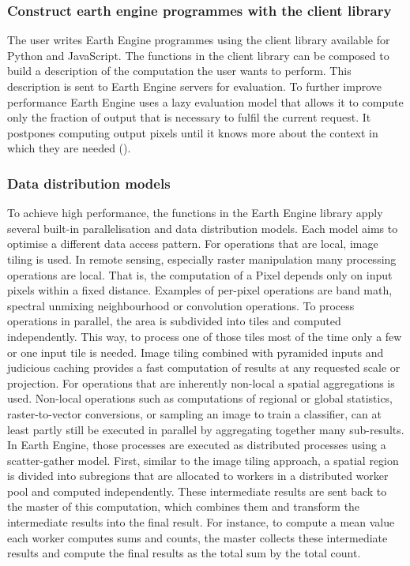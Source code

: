 \documentclass[12pt,twoside,a4paper,final]{report}
\begin{document}
\subsubsection{Construct earth engine programmes with the client library}

The user writes Earth Engine programmes using the client library available for Python and JavaScript.
The functions in the client library can be composed to build a description of the computation the user wants to perform. This description is sent to Earth Engine servers for evaluation. To further improve performance Earth Engine uses a lazy evaluation model that allows it to compute only the fraction of output that is necessary to fulfil the current request. It postpones computing output pixels until it knows more about the context in which they are needed (\cite{gorelick2017google}).


\subsubsection{Data distribution models}

To achieve high performance, the functions in the Earth Engine library apply several built-in parallelisation and data distribution models. Each model aims to optimise a different data access pattern.
For operations that are local, image tiling is used.
In remote sensing, especially raster manipulation many processing operations are local. That is, the computation of a Pixel depends only on input pixels within a fixed distance. Examples of per-pixel operations are band math, spectral unmixing neighbourhood or convolution operations. To process operations in parallel, the area is subdivided into tiles and computed independently. This way, to process one of those tiles most of the time only a few or one input tile is needed. Image tiling combined with pyramided inputs and judicious caching provides a fast computation of results at any requested scale or projection.
For operations that are inherently non-local a spatial aggregations is used.
Non-local operations such as computations of regional or global statistics, raster-to-vector conversions, or sampling an image to train a classifier, can at least partly still be executed in parallel by aggregating together many sub-results. In Earth Engine, those processes are executed as distributed processes using a scatter-gather model. First, similar to the image tiling approach, a spatial region is divided into subregions that are allocated to workers in a distributed worker pool and computed independently. These intermediate results are sent back to the master of this computation, which combines them and transform the intermediate results into the final result. For instance, to compute a mean value each worker computes sums and counts, the master collects these intermediate results and compute the final results as the total sum by the total count.
\end{document}

